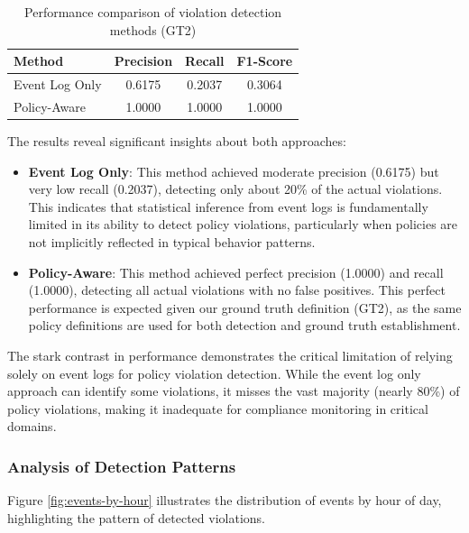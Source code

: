 \begin{table}[h]
\centering
\caption{Performance comparison of violation detection methods (GT2)}
\label{tab:detection-performance}
\begin{tabular}{lccc}
\hline
\textbf{Method} & \textbf{Precision} & \textbf{Recall} & \textbf{F1-Score} \\
\hline
Event Log Only & 0.6175 & 0.2037 & 0.3064 \\
Policy-Aware & 1.0000 & 1.0000 & 1.0000 \\
\hline
\end{tabular}
\end{table}

The results reveal significant insights about both approaches:

\begin{itemize}
    \item \textbf{Event Log Only}: This method achieved moderate precision (0.6175) but very low recall (0.2037), detecting only about 20\% of the actual violations. This indicates that statistical inference from event logs is fundamentally limited in its ability to detect policy violations, particularly when policies are not implicitly reflected in typical behavior patterns.
    
    \item \textbf{Policy-Aware}: This method achieved perfect precision (1.0000) and recall (1.0000), detecting all actual violations with no false positives. This perfect performance is expected given our ground truth definition (GT2), as the same policy definitions are used for both detection and ground truth establishment.
\end{itemize}

The stark contrast in performance demonstrates the critical limitation of relying solely on event logs for policy violation detection. While the event log only approach can identify some violations, it misses the vast majority (nearly 80\%) of policy violations, making it inadequate for compliance monitoring in critical domains.

\subsubsection{Analysis of Detection Patterns}

Figure \ref{fig:events-by-hour} illustrates the distribution of events by hour of day, highlighting the pattern of detected violations.

